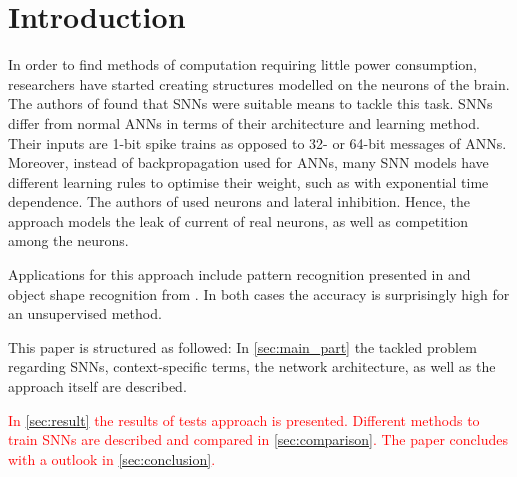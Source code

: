 \section{Introduction}

In order to find methods of computation requiring little power consumption, 
researchers have started creating structures modelled on the neurons of the brain.
The authors of \cite{SNN} found that \acp{SNN} were suitable means to tackle this task.
\acp{SNN} differ from normal \acp{ANN} in terms of their architecture and learning method.
Their inputs are 1-bit spike trains as opposed to 32- or 64-bit messages of \acp{ANN}.
Moreover, instead of backpropagation used for \acp{ANN}, many \ac{SNN} models have different learning rules to optimise their weight, 
such as  with exponential time dependence.
The authors of \cite{SNN} used  neurons and lateral inhibition.
Hence, the approach models the leak of current of real neurons, as well as competition among the neurons.

Applications for this approach include pattern recognition presented in \cite{SNN} and object shape recognition from \cite{object_detection_SNN}.
In both cases the accuracy is surprisingly high for an unsupervised method.

This paper is structured as followed:
In \autoref{sec:main_part} the tackled problem regarding \acp{SNN}, context-specific terms, the network architecture,
 as well as the approach itself are described.

\textcolor{red}{
In \autoref{sec:result} the results of tests approach is presented.
Different methods to train \acp{SNN} are described and compared in \autoref{sec:comparison}.
The paper concludes with a outlook in \autoref{sec:conclusion}.}